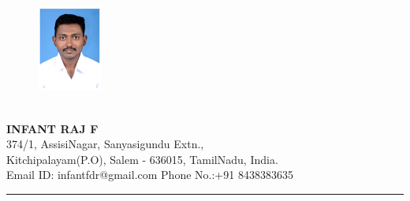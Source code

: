\documentclass{article}
\begin{document}
	\begin{figure}
		
	\begin{center}
	\includegraphics[width=60pt]{Infantraj}
	\end{center}
\end{figure}
\huge \textbf{\\INFANT RAJ F}  \\
\Large 374/1, AssisiNagar, Sanyasigundu Extn.,\\
Kitchipalayam(P.O), Salem - 636015, TamilNadu, India.\\
Email ID: infantfdr@gmail.com Phone No.:+91 8438383635\\
\hrule 
\end{document}
